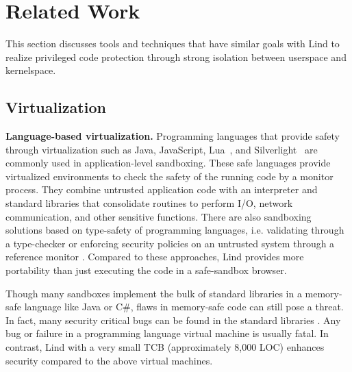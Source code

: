 \section{Related Work}
\label{sec.related_work}

This section discusses tools and techniques that have similar goals
with Lind to realize privileged code protection through strong
isolation between userspace and kernelspace.
	
\subsection{Virtualization}

\textbf{Language-based virtualization.}
Programming languages that provide safety through virtualization such
as Java, JavaScript, Lua~\cite{Lua}, and
Silverlight~\cite{Silverlight} are commonly used in application-level
sandboxing. These safe languages provide virtualized environments to
check the safety of the running code by a monitor process. They
combine untrusted application code with an interpreter and
standard libraries that consolidate routines to perform I/O, network
communication, and other sensitive functions. 
%
There are also sandboxing solutions based on type-safety of programming
languages, i.e. validating through a type-checker \cite{JS-Sandboxing}
or enforcing security policies on an untrusted system through a
reference monitor \cite{JS-Sandboxing1}. Compared to these approaches,
Lind provides more portability than just executing the code in a
safe-sandbox browser. 

Though many sandboxes implement the bulk of standard libraries in a
memory-safe language like Java or C\#, flaws in memory-safe code can
still pose a threat. In fact, many security critical bugs can be found
in the standard libraries \cite{JavaBugs, Java-Lessons}. 
Any bug or failure in a programming language virtual
machine is usually fatal. In contrast, Lind with a very small TCB (approximately
8,000 LOC) enhances security compared to the above virtual machines.

